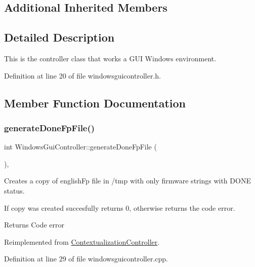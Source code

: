 \subsection*{Additional Inherited Members}


\subsection{Detailed Description}
This is the controller class that works a G\+UI Windows environment. 

Definition at line 20 of file windowsguicontroller.\+h.



\subsection{Member Function Documentation}
\mbox{\label{classWindowsGuiController_aa78e32ce3635fc99f846d545d4a320b3}} 
\subsubsection{\texorpdfstring{generate\+Done\+Fp\+File()}{generateDoneFpFile()}}
{\footnotesize\ttfamily int Windows\+Gui\+Controller\+::generate\+Done\+Fp\+File (\begin{DoxyParamCaption}{ }\end{DoxyParamCaption})\hspace{0.3cm}{\ttfamily [override]}, {\ttfamily [virtual]}}



Creates a copy of english\+Fp file in /tmp with only firmware strings with D\+O\+NE status. 

If copy was created succesfully returns 0, otherwise returns the code error. \begin{DoxyReturn}{Returns}
Code error 
\end{DoxyReturn}


Reimplemented from \mbox{\hyperlink{classContextualizationController_af142a8bbd561278c3423ccad3b40c910}{Contextualization\+Controller}}.



Definition at line 29 of file windowsguicontroller.\+cpp.

